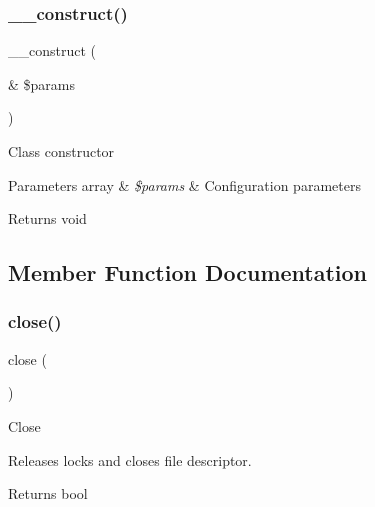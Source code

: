 \subsubsection{\texorpdfstring{\+\_\+\+\_\+construct()}{\_\_construct()}}
{\footnotesize\ttfamily \+\_\+\+\_\+construct (\begin{DoxyParamCaption}\item[{\&}]{\$params }\end{DoxyParamCaption})}

Class constructor


\begin{DoxyParams}[1]{Parameters}
array & {\em \$params} & Configuration parameters \\
\hline
\end{DoxyParams}
\begin{DoxyReturn}{Returns}
void 
\end{DoxyReturn}


\subsection{Member Function Documentation}
\mbox{\label{class_c_i___session__files__driver_aa69c8bf1f1dcf4e72552efff1fe3e87e}} 
\subsubsection{\texorpdfstring{close()}{close()}}
{\footnotesize\ttfamily close (\begin{DoxyParamCaption}{ }\end{DoxyParamCaption})}

Close

Releases locks and closes file descriptor.

\begin{DoxyReturn}{Returns}
bool 
\end{DoxyReturn}
\mbox{\label{class_c_i___session__files__driver_aaec5812f6b4eb6835f88d3baa06a002a}} 
